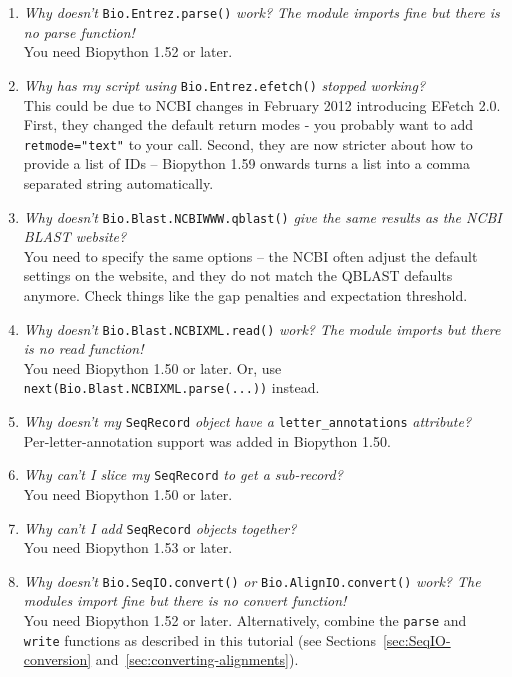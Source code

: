 \documentclass{report}
\begin{document}
\begin{enumerate}
  \item \emph{Why doesn't} \verb|Bio.Entrez.parse()| \emph{work? The module imports fine but there is no parse function!} \\
  You need Biopython 1.52 or later.

  \item \emph{Why has my script using} \verb|Bio.Entrez.efetch()| \emph{stopped working?} \\
  This could be due to NCBI changes in February 2012 introducing EFetch 2.0.
  First, they changed the default return modes - you probably want to add \verb|retmode="text"| to
  your call.
  Second, they are now stricter about how to provide a list of IDs -- Biopython 1.59 onwards
  turns a list into a comma separated string automatically.

  \item \emph{Why doesn't} \verb|Bio.Blast.NCBIWWW.qblast()| \emph{give the same results as the NCBI BLAST website?} \\
  You need to specify the same options -- the NCBI often adjust the default settings on the website,
  and they do not match the QBLAST defaults anymore. Check things like the gap penalties and expectation threshold.

  \item \emph{Why doesn't} \verb|Bio.Blast.NCBIXML.read()| \emph{work? The module imports but there is no read function!} \\
  You need Biopython 1.50 or later.  Or, use \texttt{next(Bio.Blast.NCBIXML.parse(...))} instead.
  
  \item \emph{Why doesn't my} \verb|SeqRecord| \emph{object have a} \verb|letter_annotations| \emph{attribute?} \\
  Per-letter-annotation support was added in Biopython 1.50.
  
 \item \emph{Why can't I slice my} \verb|SeqRecord| \emph{to get a sub-record?} \\
  You need Biopython 1.50 or later.

 \item \emph{Why can't I add} \verb|SeqRecord| \emph{objects together?} \\
  You need Biopython 1.53 or later.

  \item \emph{Why doesn't} \verb|Bio.SeqIO.convert()| \emph{or} \verb|Bio.AlignIO.convert()| \emph{work? The modules import fine but there is no convert function!} \\
  You need Biopython 1.52 or later. Alternatively, combine the \verb|parse| and \verb|write|
  functions as described in this tutorial (see Sections~\ref{sec:SeqIO-conversion} and~\ref{sec:converting-alignments}).


\end{enumerate}
\end{document}

